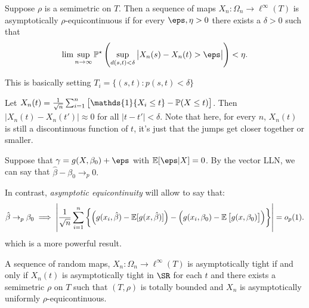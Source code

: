 \begin{definition}
	\label{def:p-equicont}
	Suppose \(\rho\) is a semimetric on  \(T\). Then a sequence of maps \(X_n:\Omega_n \to \ell^\infty(T)\) is asymptotically \(\rho\)-equicontinuous if for every  \(\eps,\eta>0\) there exists a  \(\delta >0\) such that
	\[
		\lim\sup_{n\to\infty} \P^\star\left(\sup_{d(s,t)<\delta} \left|X_n(s)-X_n(t)>\eps\right|\right)<\eta
	.\] 
\end{definition}
\begin{remark*}
	This is basically setting \(T_i = \{(s,t):p(s,t) <\delta\} \)	
\end{remark*}
\begin{example*}
	Let \(X_n(t) = \frac{1}{\sqrt{n}}\sum_{i=1}^n \left[\mathds{1}\{X_i\leq t\}-\P(X\leq t) \right]\). Then \(\left|X_n(t) - X_n(t')\right|\approx 0\) for all \(|t-t'|<\delta\). Note that here, for every \(n\),  \(X_n(t)\) is still a discontinuous function of  \(t\), it's just that the jumps get closer together or smaller. 
\end{example*}
\begin{example*}
	Suppose that \(\gamma = g(X,\beta_0)+\eps\) with  \(\E[\eps|X]=0\). By the vector LLN, we can say that \(\hat\beta-\beta_0 \to_p 0.\)
	
	In contrast, \textit{asymptotic equicontinuity} will allow to say that:
	\[
		\hat\beta\to_p \beta_0 \implies \left|\frac{1}{\sqrt{n}} \sum_{i=1}^n \left\{\left(g(x_i,\hat\beta) - \mathbb{E}[g(x,\hat\beta)] \right) - \left(g(x_i,\beta_0) - \mathbb{E}\left[g(x,\beta_0)\right]\right)\right\}\right|=o_p(1)
	.\]
	which is a more powerful result.
\end{example*}
\begin{theorem}
	\label{thm:vdv1.5.7}
	A sequence of random maps, \(X_n:\Omega_n\to \ell^\infty(T)\) is asymptotically tight if and only if  \(X_n(t)\) is asymptotically tight in  \(\SR\) for each \(t\) and there exists a semimetric  \(\rho\) on  \(T\) such that  \((T,\rho)\) is totally bounded and  \(X_n\) is asymptotically uniformly  \(\rho\)-equicontinuous. 
\end{theorem}
